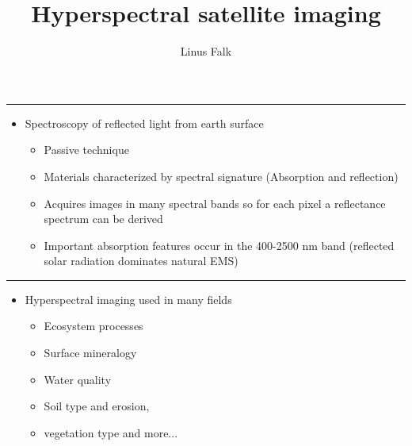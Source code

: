 \documentclass[12pt,preprintnumbers,amsmath,amssymb,nofootinbib,superscriptaddress]{revtex4-1}
\begin{document}


\vspace{10cm}

\title{Hyperspectral satellite imaging}


\author{Linus Falk}



\maketitle

\newpage


\newpage
{}\label{Ueff}
\vspace{-0.2cm}\hrule

\vspace{0.5cm}


  \begin{itemize}
    \item Spectroscopy of reflected light from earth surface
    \begin{itemize}
      \item Passive technique
      \item Materials characterized by spectral signature (Absorption and reflection)
      \item Acquires images in many spectral bands so for each pixel a reflectance spectrum can be derived
      \item Important absorption features occur in the 400-2500 nm band (reflected solar radiation dominates natural EMS)
    \end{itemize}
  \end{itemize}

\vspace{1cm}


\newpage

\label{Ueff}
\vspace{-0.2cm}\hrule

\vspace{2cm}

  \begin{itemize}
    \item Hyperspectral imaging used in many fields 
      \begin{itemize}
        \item Ecosystem processes
        \item Surface mineralogy
        \item Water quality
        \item Soil type and erosion, 
        \item vegetation type and more...
      \end{itemize}
  \end{itemize}
\end{document}
